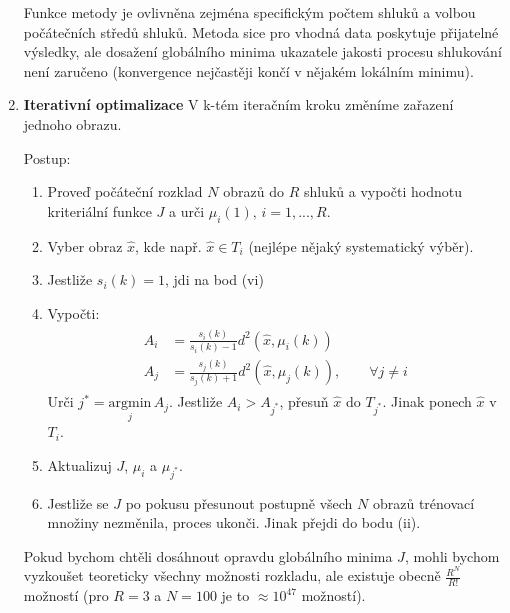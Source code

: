 \begin{enumerate}
Funkce metody je ovlivněna zejména specifickým počtem shluků a volbou počátečních středů shluků. Metoda sice pro vhodná data poskytuje přijatelné výsledky, ale dosažení globálního minima ukazatele jakosti  procesu shlukování není zaručeno (konvergence nejčastěji končí v nějakém lokálním minimu).

\item \textbf{Iterativní optimalizace}
V k-tém iteračním kroku změníme zařazení jednoho obrazu.

Postup:
\begin{enumerate}[label=(\roman*)]
\item Proveď  počáteční rozklad $ N $ obrazů do $ R $ shluků a vypočti hodnotu kriteriální funkce $ J $ a urči $ \mu_i(1), \, i=1,...,R $.
\item Vyber obraz $ \hat{x} $, kde např. $ \hat{x} \in T_i $ (nejlépe nějaký systematický výběr).
\item Jestliže $ s_i(k) = 1 $, jdi na bod (vi)
\item Vypočti:
\begin{align}
\begin{split}
A_i &= \frac{s_i(k)}{s_i(k) - 1} d^2(\hat{x}, \mu_i(k)) \\
A_j &= \frac{s_j(k)}{s_j(k) + 1} d^2(\hat{x}, \mu_j(k)), \qquad \forall j \neq i
\end{split}
\end{align}
Urči $ j^* = \underset{j}{\mathrm{argmin}} \, A_j $. Jestliže $ A_i > A_{j^*} $, přesuň $ \hat{x} $ do $ T_{j^*} $. Jinak ponech $ \hat{x} $ v $ T_i $.
\item Aktualizuj $ J $, $ \mu_i $ a $ \mu_{j^*} $.
\item Jestliže se $ J $ po pokusu přesunout postupně všech $ N $ obrazů trénovací množiny nezměnila, proces ukonči. Jinak přejdi do bodu (ii).
\end{enumerate}

Pokud bychom chtěli dosáhnout opravdu globálního minima $ J $, mohli bychom vyzkoušet teoreticky všechny možnosti rozkladu, ale existuje obecně $ \frac{R^N}{R!} $ možností (pro $ R = 3 $ a $ N = 100 $ je to $ \approx 10^{47} $ možností).
\end{enumerate}

